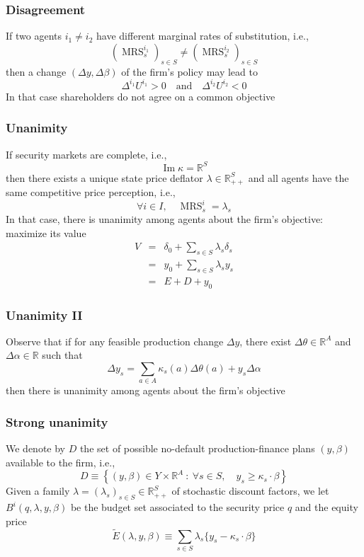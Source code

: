 \documentclass[blue]{beamer}
\def\R{\mathbb{R}}
\def\geq{\geqslant}
\def\et{\quad \textrm{and} \quad}
\DeclareMathOperator\MRS{MRS}
\DeclareMathOperator\Range{Im}
\theoremstyle{definition}
\theoremstyle{example}
\begin{document}

\begin{frame}\frametitle{Disagreement}

If  two agents $i_1\neq i_2$ have different marginal rates of substitution, i.e.,
\[
(\MRS^{i_1}_s)_{s\in S} \neq (\MRS^{i_2}_s)_{s\in S}
\]
then a change $(\Delta y, \Delta \beta)$ of the firm's policy may lead to
\[
\Delta^{i_1} U^{i_1} >0 \et \Delta^{i_2} U^{i_2} <0
\]
In that case shareholders do not agree on a common objective
\end{frame}


\begin{frame}\frametitle{Unanimity}

If security markets are complete, i.e.,
\[
\Range \kappa = \R^S
\]
then there exists a unique state price deflator $\lambda \in \R^S_{++}$ and all agents have the same competitive price perception, i.e.,
\[
\forall i\in I, \quad \MRS^i_s = \lambda_s
\]
In that case, there is unanimity among agents about the firm's objective: \alert{maximize its value}
\begin{eqnarray*}
V & = & \delta_0 + \sum_{s\in S} \lambda_s \delta_s \\
& = & y_0 + \sum_{s\in S} \lambda_s y_s \\
& = & E + D + y_0
\end{eqnarray*}

\end{frame}


\begin{frame}\frametitle{Unanimity II}

Observe that if for any feasible production change $\Delta y$, there exist $\Delta \theta \in \R^A$ and $\Delta \alpha \in \R$ such that
\[
\Delta y_s = \sum_{a\in A} \kappa_s(a) \Delta \theta(a) + y_s \Delta \alpha
\]
then there is unanimity among agents about the firm's objective

\end{frame}


\begin{frame}\frametitle{Strong unanimity}

We denote by $D$ the set of possible no-default production-finance plans $(y,\beta)$ available to the firm, i.e.,
\[
D \equiv \left\{ (y,\beta) \in Y \times \R^A \ \colon \ \forall s\in S, \quad y_s \geq \kappa_s \cdot \beta \right\}
\]
Given a family $\lambda=(\lambda_s)_{s\in S} \in \R^S_{++}$ of stochastic discount factors, we let $B^i(q,\lambda,y,\beta)$ be the budget set associated to the security price $q$ and the equity price
\[
\widetilde{E}(\lambda,y,\beta)\equiv \sum_{s\in S} \lambda_s \{ y_s - \kappa_s \cdot \beta \}
\]

\end{frame}
\end{document}
